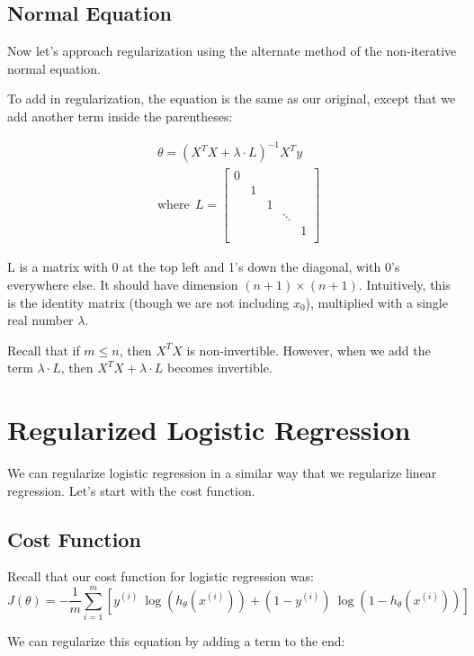 \subsection{Normal Equation}
Now let's approach regularization using the alternate method of the non-iterative normal equation.

To add in regularization, the equation is the same as our original, except that we add another term inside the parentheses:

\begin{align*}
& \theta = \left( X^TX + \lambda \cdot L \right)^{-1} X^Ty \\
& \text{where}\ \ L = 
\begin{bmatrix} 
0 & & & & \\ 
& 1 & & & \\ 
& & 1 & & \\ 
& & & \ddots & \\
& & & & 1 \\
\end{bmatrix}
\end{align*}

L is a matrix with 0 at the top left and 1's down the diagonal, with 0's everywhere else. It should have dimension $(n+1)\times(n+1)$. Intuitively, this is the identity matrix (though we are not including $x_0$), multiplied with a single real number $\lambda$.

Recall that if $m \leq n$, then $X^TX$ is non-invertible. However, when we add the term $\lambda \cdot L$, then $X^TX + \lambda \cdot L$ becomes invertible.
 
\section{Regularized Logistic Regression}
We can regularize logistic regression in a similar way that we regularize linear regression. Let's start with the cost function.
\subsection{Cost Function} 
Recall that our cost function for logistic regression was:
\begin{equation}
J(\theta) = - \frac{1}{m} \sum_{i=1}^m \left[ y^{(i)}\ \log (h_\theta (x^{(i)})) + (1 - y^{(i)})\ \log (1 - h_\theta(x^{(i)})) \right]
\end{equation}

We can regularize this equation by adding a term to the end:

